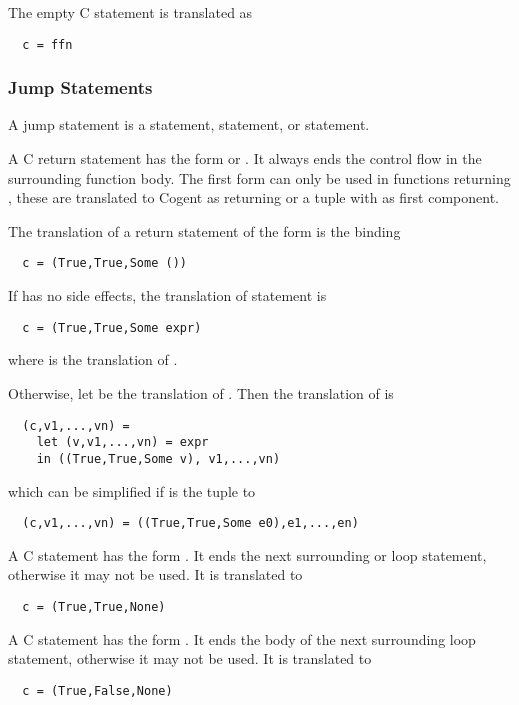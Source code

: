 The empty C statement \code{;} is translated as
\begin{verbatim}
  c = ffn
\end{verbatim}

\subsubsection{Jump Statements}

A jump statement is a  statement,  statement, or  statement.

A C return statement has the form  or . It always ends the control flow in the surrounding
function body. The first form can only be used in functions returning , these are translated to Cogent as returning 
\code{()} or a tuple with \code{()} as first component.

The translation of a return statement of the form  is the binding
\begin{verbatim}
  c = (True,True,Some ())
\end{verbatim}
If  has no
side effects, the translation of statement  is
\begin{verbatim}
  c = (True,True,Some expr)
\end{verbatim}
where  is
the translation of . 

Otherwise, let  be the translation of . Then 
the translation of  is
\begin{verbatim}
  (c,v1,...,vn) = 
    let (v,v1,...,vn) = expr
    in ((True,True,Some v), v1,...,vn)
\end{verbatim}
which can be simplified if  is the tuple  to
\begin{verbatim}
  (c,v1,...,vn) = ((True,True,Some e0),e1,...,en)
\end{verbatim}

A C  statement has the form . It ends the next surrounding  or loop statement,
otherwise it may not be used. It is translated to
\begin{verbatim}
  c = (True,True,None)
\end{verbatim}

A C  statement has the form . It ends the body of the next surrounding loop statement,
otherwise it may not be used. It is translated to
\begin{verbatim}
  c = (True,False,None)
\end{verbatim}

